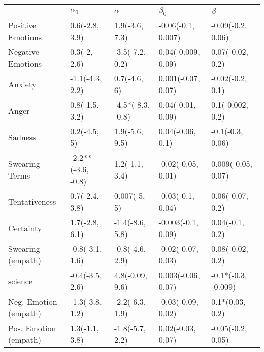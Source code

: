 \begin{tabular}{lllll}
\toprule
{} &          $\alpha_0$ &           $\alpha$ &           $\beta_0$ &              $\beta$ \\
\midrule
Positive Emotions     &      0.6(-2.8, 3.9) &     1.9(-3.6, 7.3) &  -0.06(-0.1, 0.007) &    -0.09(-0.2, 0.06) \\
Negative Emotions     &        0.3(-2, 2.6) &    -3.5(-7.2, 0.2) &  0.04(-0.009, 0.09) &     0.07(-0.02, 0.2) \\
Anxiety               &     -1.1(-4.3, 2.2) &       0.7(-4.6, 6) &  0.001(-0.07, 0.07) &     -0.02(-0.2, 0.1) \\
Anger                 &      0.8(-1.5, 3.2) &  -4.5*(-8.3, -0.8) &   0.04(-0.01, 0.09) &     0.1(-0.002, 0.2) \\
Sadness               &        0.2(-4.5, 5) &     1.9(-5.6, 9.5) &    0.04(-0.06, 0.1) &     -0.1(-0.3, 0.06) \\
Swearing Terms        &  -2.2**(-3.6, -0.8) &     1.2(-1.1, 3.4) &  -0.02(-0.05, 0.01) &   0.009(-0.05, 0.07) \\
Tentativeness         &      0.7(-2.4, 3.8) &       0.007(-5, 5) &   -0.03(-0.1, 0.04) &     0.06(-0.07, 0.2) \\
Certainty             &      1.7(-2.8, 6.1) &    -1.4(-8.6, 5.8) &  -0.003(-0.1, 0.09) &      0.04(-0.1, 0.2) \\
Swearing (empath)     &     -0.8(-3.1, 1.6) &    -0.8(-4.6, 2.9) &  -0.02(-0.07, 0.03) &     0.08(-0.02, 0.2) \\
science               &     -0.4(-3.5, 2.6) &    4.8(-0.09, 9.6) &  0.003(-0.06, 0.07) &  -0.1*(-0.3, -0.009) \\
Neg. Emotion (empath) &     -1.3(-3.8, 1.2) &    -2.2(-6.3, 1.9) &  -0.03(-0.09, 0.02) &      0.1*(0.03, 0.2) \\
Pos. Emotion (empath) &      1.3(-1.1, 3.8) &    -1.8(-5.7, 2.2) &   0.02(-0.03, 0.07) &    -0.05(-0.2, 0.05) \\
\bottomrule
\end{tabular}
